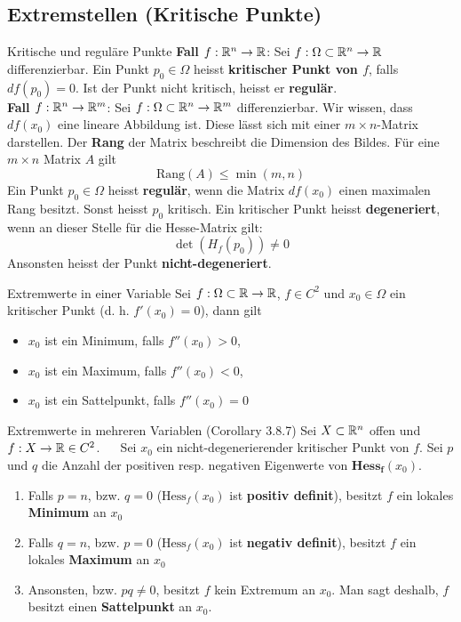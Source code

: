 \subsection{Extremstellen (Kritische Punkte)}

\begin{Definition}[label=R1]{Kritische und reguläre Punkte}{}
	\textbf{Fall $f: \mathbb{R}^n \to \mathbb{R}$}: Sei 	$f: \Omega \subset \mathbb{R}^n \to \mathbb{R}$ differenzierbar. Ein Punkt $p_0 \in \Omega$ heisst \textbf{kritischer Punkt von $f$}, falls $df(p_0)=0$. Ist der Punkt nicht kritisch, heisst er \textbf{regulär}.\\
	
	\textbf{Fall $f: \mathbb{R}^n \to \mathbb{R}^m$}: Sei $f: \Omega \subset \mathbb{R}^n \to \mathbb{R}^m$ differenzierbar. Wir wissen, dass $df(x_0)$ eine lineare Abbildung ist.
	Diese lässt sich mit einer $m\times n$-Matrix darstellen. Der \textbf{Rang} der Matrix beschreibt die Dimension des Bildes.
	Für eine $m \times n$ Matrix $A$ gilt \[\text{Rang}(A) \leq \min(m, n)\] Ein Punkt $p_0 \in \Omega$ heisst \textbf{regulär},
	wenn die Matrix $df(x_0)$ einen maximalen Rang besitzt. Sonst heisst $p_0$ kritisch.
	Ein kritischer Punkt heisst \textbf{degeneriert}, wenn an dieser Stelle für die Hesse-Matrix gilt:
	\[\det(H_f(p_0)) \neq 0\]
	Ansonsten heisst der Punkt \textbf{nicht-degeneriert}.
\end{Definition}

\begin{Satz}{Extremwerte in einer Variable}{}
	Sei $f: \Omega \subset \mathbb{R} \to \mathbb{R}$, $f \in C^2$ und $x_0 \in \Omega$ ein kritischer Punkt (d. h. $f'(x_0) = 0$), dann gilt
	\begin{itemize}
		\item $x_0$ ist ein Minimum, falls $f''(x_0) > 0$,
		\item $x_0$ ist ein Maximum, falls $f''(x_0) < 0$,
		\item $x_0$ ist ein Sattelpunkt, falls $f''(x_0) = 0$
	\end{itemize}
\end{Satz}

\begin{Satz}{Extremwerte in mehreren Variablen (Corollary 3.8.7)}{}
Sei $X\subset \mathbb{R}^n$ offen und $f: X \rightarrow \mathbb{R} \in C^2$. ~~
Sei $x_0$ ein nicht-degenerierender kritischer Punkt von $f$. Sei $p$ und $q$
die Anzahl der positiven resp. negativen Eigenwerte von $\mathbf{Hess_f}(x_0)$.

\begin{enumerate}
\item Falls $p=n$, bzw. $q=0$ ($\text{Hess}_f(x_0)$ ist \textbf{positiv definit}), besitzt $f$ ein lokales \textbf{Minimum} an $x_0$
\item Falls $q=n$, bzw. $p=0$ ($\text{Hess}_f(x_0)$ ist \textbf{negativ definit}), besitzt $f$ ein lokales \textbf{Maximum} an $x_0$
\item Ansonsten, bzw. $pq\neq 0$, besitzt $f$ kein Extremum an $x_0$. Man sagt deshalb, $f$ besitzt einen \textbf{Sattelpunkt} an $x_0$.
\end{enumerate}
\end{Satz}

